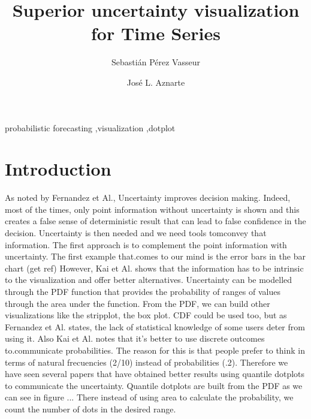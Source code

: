 \documentclass[a4paper,3p,sort&compress]{elsarticle}
\begin{document}
\linenumbers

\newcommand{\no}{NO\textsubscript{2}\xspace}

\begin{frontmatter}

  \title{Superior uncertainty visualization for Time Series}


  \author{Sebasti\'an P\'erez Vasseur}
  \author{Jos\'e L. Aznarte}
  \address{Artificial Intelligence Department\\Universidad Nacional de
    Educaci\'on a Distancia --- UNED\\c/ Juan del Rosal, 16, Madrid, Spain}
  

\begin{abstract}
  
\end{abstract}

\begin{keyword}
probabilistic forecasting \sep visualization \sep dotplot
\end{keyword}

\end{frontmatter}


\section{Introduction}
\label{sec:intro}
As noted by Fernandez et Al., Uncertainty improves decision making. Indeed, most of the times, only point information without uncertainty is shown and this creates a false sense of deterministic result that can lead to false confidence in the decision. 
Uncertainty is then needed and we need tools tomconvey that information.
The first approach is to complement the point information with uncertainty. The first example that.comes to our mind is the error bars in the bar chart (get ref)
However, Kai et Al. shows that the information has to be intrinsic to the visualization and offer better alternatives. Uncertainty can be modelled through the PDF function that provides the probability of ranges of values through the area under the function. From the PDF, we can build other visualizations like the stripplot, the box plot. CDF could be used too, but as Fernandez et Al. states, the lack of statistical knowledge of some users deter from using it. 
Also Kai et Al. notes that it's better to use discrete outcomes to.communicate probabilities. The reason for this is that people prefer to think in terms of natural frecuencies (2/10) instead of probabilities (.2). Therefore we have seen several papers that have obtained better results using quantile dotplots to communicate the uncertainty. 
Quantile dotplots are built from the PDF as we can see in figure ... There instead of using area to calculate the probability, we count the number of dots in the desired range.
\end{document}
